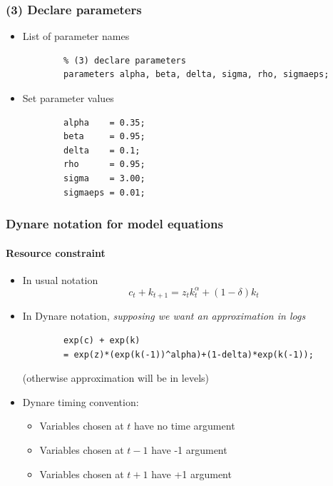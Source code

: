 \documentclass{beamer}
\begin{document}
\begin{frame}[fragile]
\frametitle{(3) Declare parameters}
\begin{itemize}
	\item List of parameter names
	
	\begin{verbatim}
		% (3) declare parameters
		parameters alpha, beta, delta, sigma, rho, sigmaeps;
	\end{verbatim}
	
	\item Set parameter values
	
	\begin{verbatim}
		alpha    = 0.35;
		beta     = 0.95;
		delta    = 0.1;
		rho      = 0.95;
		sigma    = 3.00;
		sigmaeps = 0.01;
	\end{verbatim}
	
	
\end{itemize}
\end{frame}


\begin{frame}[fragile]
\frametitle{Dynare notation for model equations}
\framesubtitle{Resource constraint}
\begin{itemize}
	\item In usual notation
	$$
	c_{t}+k_{t+1}=z_{t} k_{t}^{\alpha}+(1-\delta) k_{t}
	$$
	
	\item In Dynare notation, \textit{supposing we want an approximation in logs}
	\begin{verbatim}
		exp(c) + exp(k)
		= exp(z)*(exp(k(-1))^alpha)+(1-delta)*exp(k(-1));
	\end{verbatim}
	(otherwise approximation will be in levels)
	\item Dynare timing convention:
	\begin{itemize}
		\item Variables chosen at $ t $ have no time argument
		\item Variables chosen at $ t-1 $ have -1 argument
		\item Variables chosen at $ t+1 $ have +1 argument
	\end{itemize}
	
	
\end{itemize}
\end{frame}
\end{document}
